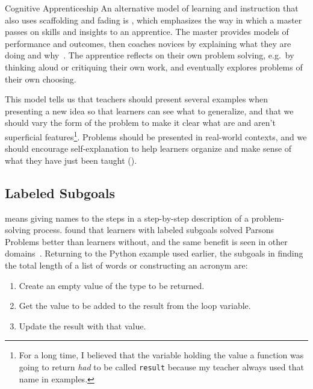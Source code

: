 \begin{aside}{Cognitive Apprenticeship}
  An alternative model of learning and instruction that also uses scaffolding and fading
  is ,
  which emphasizes the way in which a master passes on skills and insights to an apprentice.
  The master provides models of performance and outcomes,
  then coaches novices by explaining what they are doing and why~\cite{Coll1991,Casp2007}.
  The apprentice reflects on their own problem solving,
  e.g.\ by thinking aloud or critiquing their own work,
  and eventually explores problems of their own choosing.

  This model tells us that
  teachers should present several examples when presenting a new idea
  so that learners can see what to generalize,
  and that we should vary the form of the problem to make it clear
  what are and aren't superficial features\footnote{For a long time,
    I believed that the variable holding the value a function was going to return
    \emph{had} to be called \texttt{result}
    because my teacher always used that name in examples.}.
  Problems should be presented in real-world contexts,
  and we should encourage self-explanation to help learners organize and make sense of what they have just been taught
  ().
\end{aside}

\subsection*{Labeled Subgoals}

 means
giving names to the steps in a step-by-step description of a problem-solving process.
\cite{Marg2016,Morr2016} found that learners with labeled subgoals
solved Parsons Problems better than learners without,
and the same benefit is seen in other domains~\cite{Marg2012}.
Returning to the Python example used earlier,
the subgoals in finding the total length of a list of words or constructing an acronym are:

\begin{enumerate}

\item
  Create an empty value of the type to be returned.

\item
  Get the value to be added to the result from the loop variable.

\item
  Update the result with that value.

\end{enumerate}

